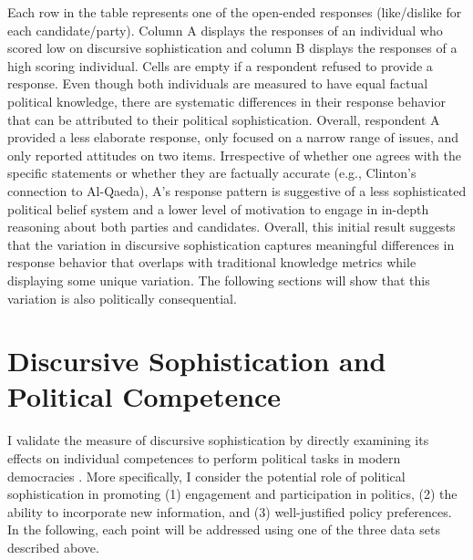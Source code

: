 Each row in the table represents one of the open-ended responses (like/dislike for each candidate/party). Column A displays the responses of an individual who scored low on discursive sophistication and column B displays the responses of a high scoring individual. Cells are empty if a respondent refused to provide a response. Even though both individuals are measured to have equal factual political knowledge, there are systematic differences in their response behavior that can be attributed to their political sophistication. Overall, respondent A provided a less elaborate response, only focused on a narrow range of issues, and only reported attitudes on two items. Irrespective of whether one agrees with the specific statements or whether they are factually accurate (e.g., Clinton's connection to Al-Qaeda), A's response pattern is suggestive of a less sophisticated political belief system and a lower level of motivation to engage in in-depth reasoning about both parties and candidates. Overall, this initial result suggests that the variation in discursive sophistication captures meaningful differences in response behavior that overlaps with traditional knowledge metrics while displaying some unique variation. The following sections will show that this variation is also politically consequential.



\section*{Discursive Sophistication and Political Competence}

I validate the measure of discursive sophistication by directly examining its effects on individual competences to perform political tasks in modern democracies \citep[cf.][]{lupia2006elitism,lupia2015uninformed}. More specifically, I consider the potential role of political sophistication in promoting (1) engagement and participation in politics, (2) the ability to incorporate new information, and (3) well-justified policy preferences. In the following, each point will be addressed using one of the three data sets described above.


